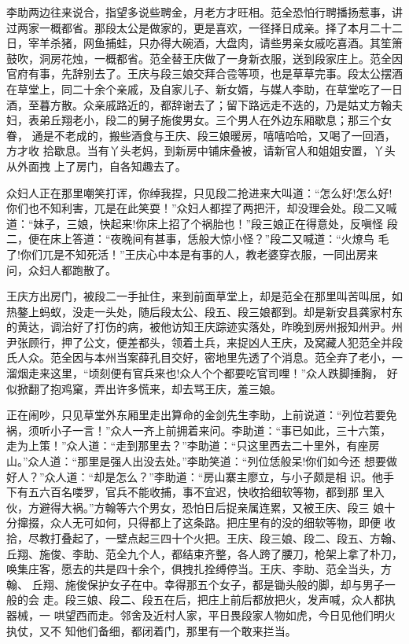 李助两边往来说合，指望多说些聘金，月老方才旺相。范全恐怕行聘播扬惹事，讲
过两家一概都省。那段太公是做家的，更是喜欢，一径择日成亲。择了本月二十二
日，宰羊杀猪，网鱼捕蛙，只办得大碗酒，大盘肉，请些男亲女戚吃喜酒。其笙箫
鼓吹，洞房花烛，一概都省。范全替王庆做了一身新衣服，送到段家庄上。范全因
官府有事，先辞别去了。王庆与段三娘交拜合卺等项，也是草草完事。段太公摆酒
在草堂上，同二十余个亲戚，及自家儿子、新女婿，与媒人李助，在草堂吃了一日
酒，至暮方散。众亲戚路近的，都辞谢去了；留下路远走不迭的，乃是姑丈方翰夫
妇，表弟丘翔老小，段二的舅子施俊男女。三个男人在外边东厢歇息；那三个女眷，
通是不老成的，搬些酒食与王庆、段三娘暖房，嘻嘻哈哈，又喝了一回酒，方才收
拾歇息。当有丫头老妈，到新房中铺床叠被，请新官人和姐姐安置，丫头从外面拽
上了房门，自各知趣去了。

众妇人正在那里嘲笑打诨，你绰我捏，只见段二抢进来大叫道：“怎么好!怎么好!
你们也不知利害，兀是在此笑耍！”众妇人都捏了两把汗，却没理会处。段二又喊
道：“妹子，三娘，快起来!你床上招了个祸胎也！”段三娘正在得意处，反嗔怪
段二，便在床上答道：“夜晚间有甚事，恁般大惊小怪？”段二又喊道：“火燎鸟
毛了!你们兀是不知死活！”王庆心中本是有事的人，教老婆穿衣服，一同出房来
问，众妇人都跑散了。

王庆方出房门，被段二一手扯住，来到前面草堂上，却是范全在那里叫苦叫屈，如
热鏊上蚂蚁，没走一头处，随后段太公、段五、段三娘都到。却是新安县龚家村东
的黄达，调治好了打伤的病，被他访知王庆踪迹实落处，昨晚到房州报知州尹。州
尹张顾行，押了公文，便差都头，领着土兵，来捉凶人王庆，及窝藏人犯范全并段
氏人众。范全因与本州当案薛孔目交好，密地里先透了个消息。范全弃了老小，一
溜烟走来这里，“顷刻便有官兵来也!众人个个都要吃官司哩！”众人跌脚捶胸，
好似掀翻了抱鸡窠，弄出许多慌来，却去骂王庆，羞三娘。

正在闹吵，只见草堂外东厢里走出算命的金剑先生李助，上前说道：“列位若要免
祸，须听小子一言！”众人一齐上前拥着来问。李助道：“事已如此，三十六策，
走为上策！”众人道：“走到那里去？”李助道：“只这里西去二十里外，有座房
山。”众人道：“那里是强人出没去处。”李助笑道：“列位恁般呆!你们如今还
想要做好人？”众人道：“却是怎么？”李助道：“房山寨主廖立，与小子颇是相
识。他手下有五六百名喽罗，官兵不能收捕，事不宜迟，快收拾细软等物，都到那
里入伙，方避得大祸。”方翰等六个男女，恐怕日后捉亲属连累，又被王庆、段三
娘十分撺掇，众人无可如何，只得都上了这条路。把庄里有的没的细软等物，即便
收拾，尽教打叠起了，一壁点起三四十个火把。王庆、段三娘、段二、段五、方翰、
丘翔、施俊、李助、范全九个人，都结束齐整，各人跨了腰刀，枪架上拿了朴刀，
唤集庄客，愿去的共是四十余个，俱拽扎拴缚停当。王庆、李助、范全当头，方翰、
丘翔、施俊保护女子在中。幸得那五个女子，都是锄头般的脚，却与男子一般的会
走。段三娘、段二、段五在后，把庄上前后都放把火，发声喊，众人都执器械，一
哄望西而走。邻舍及近村人家，平日畏段家人物如虎，今日见他们明火执仗，又不
知他们备细，都闭着门，那里有一个敢来拦当。

